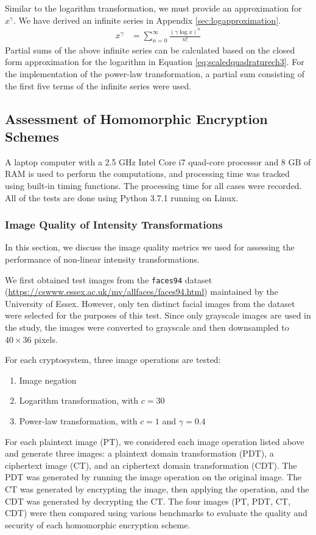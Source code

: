 Similar to the logarithm transformation, we must provide an approximation for $x^\gamma$.
We have derived an infinite series in Appendix \ref{sec:logapproximation}.
\begin{align}
	x^\gamma &= \sum_{n=0}^{\infty}{\frac{(\gamma\log{x})^n}{n!}}
\end{align}
Partial sums of the above infinite series can be calculated based on the closed form approximation for the logarithm in Equation \ref{eq:scaledquadraturech3}. For the implementation of the power-law transformation, a partial sum consisting of the first five terms of the infinite series were used.

\subsection{Assessment of Homomorphic Encryption Schemes}
A laptop computer with a 2.5 GHz Intel Core i7 quad-core processor and 8 GB of RAM is used to perform the computations, and processing time was tracked using built-in timing functions. The processing time for all cases were recorded. All of the tests are done using Python 3.7.1 running on Linux.

\subsubsection{Image Quality of Intensity Transformations}
In this section, we discuss the image quality metrics we used for assessing the performance of non-linear intensity transformations.

We first obtained test images from the \texttt{faces94} dataset (\url{https://cswww.essex.ac.uk/mv/allfaces/faces94.html}) maintained by the University of Essex. However, only ten distinct facial images from the dataset were selected for the purposes of this test. Since only grayscale images are used in the study, the images were converted to grayscale and then downsampled to $40 \times 36$ pixels.

For each cryptosystem, three image operations are tested:
\begin{enumerate}
	\item Image negation
	\item Logarithm transformation, with $c = 30$
	\item Power-law transformation, with $c = 1$ and $\gamma = 0.4$
\end{enumerate}

For each plaintext image (PT), we considered each image operation listed above and generate three images: a plaintext domain transformation (PDT), a ciphertext image (CT), and an ciphertext domain transformation (CDT). The PDT was generated by running the image operation on the original image. The CT was generated by encrypting the image, then applying the operation, and the CDT was generated by decrypting the CT. The four images (PT, PDT, CT, CDT) were then compared using various benchmarks to evaluate the quality and security of each homomorphic encryption scheme.

